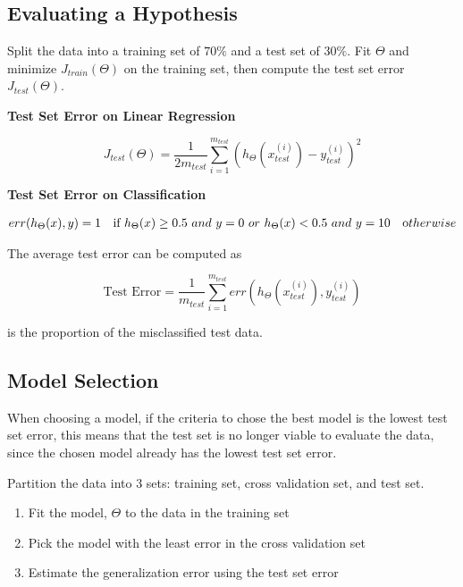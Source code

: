 \documentclass[
]{article}
\author{}
\date{}
\begin{document}
\hypertarget{header-n0}{%
\subsection{Evaluating a Hypothesis}\label{header-n0}}

Split the data into a training set of \(70\%\) and a test set of
\(30\%\). Fit \(\Theta\) and minimize \(J_{train}(\Theta)\) on the
training set, then compute the test set error \(J_{test}(\Theta)\).

\textbf{Test Set Error on Linear Regression}

\[J_{test}(\Theta) = \dfrac{1}{2m_{test}} \sum_{i=1}^{m_{test}}(h_\Theta(x^{(i)}_{test}) - y^{(i)}_{test})^2\]

\textbf{Test Set Error on Classification}

\[err(h_\Theta(x),y) = \begin{matrix} 1 & \mbox{if } h_\Theta(x) \geq 0.5\ and\ y = 0\ or\ h_\Theta(x) < 0.5\ and\ y = 1\newline 0 & \mbox otherwise \end{matrix}\]

The average test error can be computed as

\[\text{Test Error} = \dfrac{1}{m_{test}} \sum^{m_{test}}_{i=1} err(h_\Theta(x^{(i)}_{test}), y^{(i)}_{test})\]

is the proportion of the misclassified test data.

\hypertarget{header-n10}{%
\subsection{Model Selection}\label{header-n10}}

When choosing a model, if the criteria to chose the best model is the
lowest test set error, this means that the test set is no longer viable
to evaluate the data, since the chosen model already has the lowest test
set error.

Partition the data into 3 sets: training set, cross validation set, and
test set.

\begin{enumerate}
\def\labelenumi{\arabic{enumi}.}
\item
  Fit the model, \(\Theta\) to the data in the training set
\item
  Pick the model with the least error in the cross validation set
\item
  Estimate the generalization error using the test set error
\end{enumerate}
\end{document}
